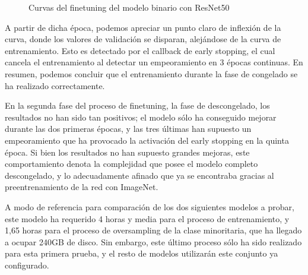 \begin{figure}[H]
	\centering
	\caption{Curvas del finetuning del modelo binario con ResNet50}
	\label{fig:curvasrensetbinaria}
	
\end{figure}

A partir de dicha época, podemos apreciar un punto claro de inflexión de la curva, donde los valores de validación se disparan, alejándose de la curva de entrenamiento. Esto es detectado por el callback de early stopping, el cual cancela el entrenamiento al detectar un empeoramiento en 3 épocas continuas. En resumen, podemos concluir que el entrenamiento durante la fase de congelado se ha realizado correctamente.

En la segunda fase del proceso de finetuning, la fase de descongelado, los resultados no han sido tan positivos; el modelo sólo ha conseguido mejorar durante las dos primeras épocas, y las tres últimas han supuesto un empeoramiento que ha provocado la activación del early stopping en la quinta época. Si bien los resultados no han supuesto grandes mejoras, este comportamiento denota la complejidad que posee el modelo completo descongelado, y lo adecuadamente afinado que ya se encontraba gracias al preentrenamiento de la red con ImageNet.

A modo de referencia para comparación de los dos siguientes modelos a probar, este modelo ha requerido 4 horas y media para el proceso de entrenamiento, y 1,65 horas para el proceso de oversampling de la clase minoritaria, que ha llegado a ocupar 240GB de disco. Sin embargo, este último proceso sólo ha sido realizado para esta primera prueba, y el resto de modelos utilizarán este conjunto ya configurado.

